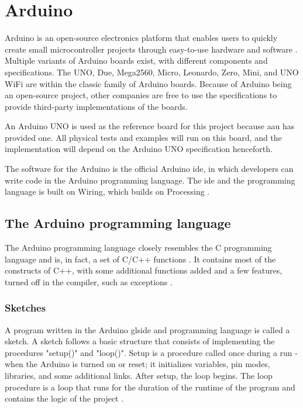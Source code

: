 \section{Arduino}\label{sec:arduino}
Arduino is an open-source electronics platform that enables users to quickly create small microcontroller projects through easy-to-use hardware and software \cite{WhatArduino}. Multiple variants of Arduino boards exist, with different components and specifications. The UNO, Due, Mega2560, Micro, Leonardo, Zero, Mini, and UNO WiFi are within the classic family of Arduino boards. Because of Arduino being an open-source project, other companies are free to use the specifications to provide third-party implementations of the boards.

An Arduino UNO is used as the reference board for this project because \gls{aau} has provided one. All physical tests and examples will run on this board, and the implementation will depend on the Arduino UNO specification henceforth.

The software for the Arduino is the official Arduino \gls{ide}, in which developers can write code in the Arduino programming language. The \gls{ide} and the programming language is built on Wiring, which builds on Processing \cite{WhatArduino,WiringOrg}.

\subsection{The Arduino programming language}\label{subsec:arduinoprogramminglanguage}
The Arduino programming language closely resembles the C programming language and is, in fact, a set of C/C++ functions \cite{ArduinoSupportC}. It contains most of the constructs of C++, with some additional functions added and a few features, turned off in the compiler, such as exceptions \cite{Nongnuorg}.

\subsubsection{Sketches}
A program written in the Arduino gls{ide} and programming language is called a sketch. A sketch follows a basic structure that consists of implementing the procedures "setup()" and "loop()". Setup is a procedure called once during a run - when the Arduino is turned on or reset; it initializes variables, pin modes, libraries, and some additional links. After setup, the loop begins. The loop procedure is a loop that runs for the duration of the runtime of the program and contains the logic of the project \cite{ArduinoLanguage}.

